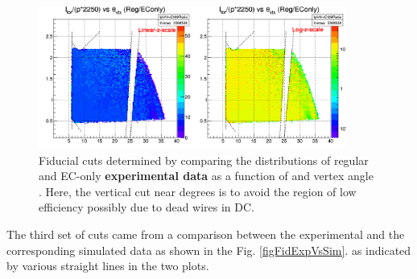 \begin{figure}[H]%
\centering
\leavevmode \includegraphics[width=0.9\textwidth]{figuresEG4/NewP2/FidCuts/invMomVsThVtxPass2Ebi1RatioRegByEConlyFidCut09cropped.png}
\caption[Fiducial cuts]{Fiducial cuts determined by comparing the distributions of regular and EC-only {\bf experimental data} as a function of \invP and vertex angle \thvtx. Here, the vertical cut near  degrees is to avoid the region of low efficiency possibly due to %
  dead wires in DC.} %
\label{figFidRegVsEC2}
\end{figure}



The third set of cuts came from a %
comparison %
between the experimental and the corresponding simulated data as shown in the Fig. \ref{figFidExpVsSim}. 
as indicated by various straight lines in the two plots.



